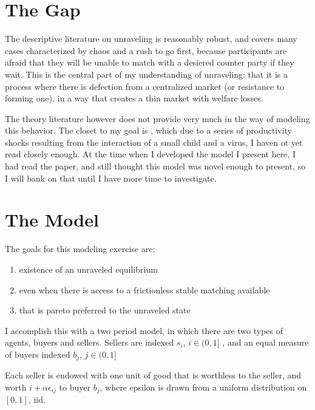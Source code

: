 \documentclass[WP]{AEA}
\begin{document}
\section{The Gap}

The descriptive literature on unraveling is reasonably robust, and covers many cases characterized by chaos and a rush to go first, because participants are afraid that they will be unable to match with a desiered counter party if they wait. This is the central part of my understanding of unraveling: that it is a process where there is defection from a centralized market (or resistance to forming one), in a way that creates a thin market with welfare losses.  

The theory literature however does not provide very much in the way of modeling this behavior.  The closet to my goal is \cite{Halaburda2010}, which due to a series of productivity shocks resulting from the interaction of a small child and a virus, I haven ot yet read closely enough.  At the time when I developed the model I present here, I had read the paper, and still thought this model was novel enough to present, so I will bank on that until I have more time to investigate.


\section{The Model}
The goals for this modeling exercise are:
\begin{enumerate}
	\item  existence of an unraveled equilibrium
	\item  even when there is access to a frictionless stable matching available
	\item  that is pareto preferred to the unraveled state
\end{enumerate}


I accomplish this with a two period model, in which there are two types of agents, buyers and sellers.
Sellers are indexed $s_i$, $i \in (0,1]$ , and an equal measure of buyers indexed $b_j$, $j \in (0,1]$

Each seller is endowed with one unit of good that is worthless to the seller, and worth $i+\alpha  \epsilon_{ij}$ to buyer $b_j$, where epsilon is drawn from a uniform distribution on $[0,1]$, iid.
\end{document}
